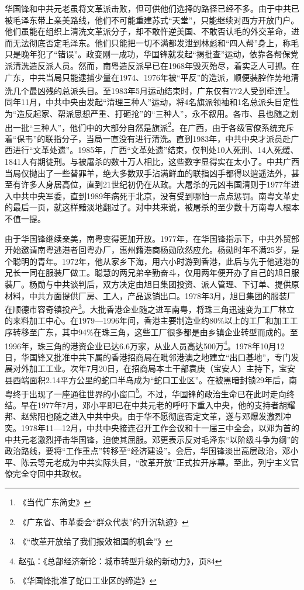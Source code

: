 华国锋和中共元老虽将文革派击败，但可供他们选择的路径已经不多。由于中共已被毛泽东带上亲美路线，他们不可能重建苏式“天堂”，只能继续对西方开放门户。他们虽能在组织上清洗文革派分子，却不敢忤逆美国、不敢否认毛的外交革命，进而无法彻底否定毛泽东。他们只能把一切不满都发泄到林彪和“四人帮”身上，称毛只是晚年犯了“错误”。政变刚一成功，华国锋就发起“揭批查”运动，依靠各帮保党派清洗造反派人员。然而，南粤造反派早已在1968年毁灭殆尽，着实乏人可抓。在广东，中共当局只能逮捕少量在1974、1976年被“平反”的造派，顺便装腔作势地清洗几个最凶残的总派头目。至1983年5月运动结束时，广东仅有772人受到牵连\footnote{《当代广东简史》}。同年11月，中共中央由发起“清理三种人”运动，将4名旗派领袖和1名总派头目定性为“造反起家、帮派思想严重、打砸抢”的“三种人”，永不叙用。各市、县也随之划出一批“三种人”，他们中的大部分自然是旗派\footnote{《广东省、市革委会“群众代表”的升沉轨迹》}。在广西，由于各级官僚系统充斥着“保韦”的联指分子，当局一直没有进行清洗。直到1983年，中共中央才派员赴广西进行“文革处遗”。1985年，广西“文革处遗”结束，仅判处10人死刑、14人死缓、1841人有期徒刑。与被屠杀的数十万人相比，这些数字显得实在太小了。中共广西当局仅抛出了一些替罪羊，绝大多数双手沾满鲜血的联指凶手都得以逍遥法外，甚至有许多人身居高位，直到21世纪初仍在从政。大屠杀的元凶韦国清则于1977年进入中共中央军委，直到1989年病死于北京，没有受到哪怕一点点惩罚。南粤文革史的最后一页，就这样黯淡地翻过了。对中共来说，被屠杀的至少数十万南粤人根本不值一提。

由于华国锋继续亲美，南粤变得更加开放。1977年，在华国锋指示下，中共外贸部开始邀请南粤逃港者回粤办厂，惠州籍港商杨勋欣然应允。杨勋时年不满25岁，是个聪明的青年。1972年，他从家乡下海，用六小时游到香港，此后与先于他逃港的兄长一同在服装厂做工。聪慧的两兄弟辛勤奋斗，仅用两年便开办了自己的旭日服装厂。杨勋与中共谈判后，双方决定由旭日集团投资、派人管理、下订单、提供原材料，中共方面提供厂房、工人，产品返销出口。1978年3月，旭日集团的服装厂在顺德市容奇镇投产\footnote{《“改革开放给了我们报效祖国的机会”》}。大批香港企业随之进军南粤，将珠三角迅速变为工厂林立的来料加工中心。在1979—1996年间，香港主要制造业约80\%以上的工厂和加工工序转移至广东，其中94\%在珠三角，这些工厂很多都是由乡镇企业转型而成的。至1996年，珠三角的港资企业已达6.6万家，从业人员高达500万\footnote{赵弘：《总部经济新论：城市转型升级的新动力》，页84}。1978年10月12日，华国锋又批准中共下属的香港招商局在毗邻港澳之地建立“出口基地”，专门发展对外加工工业。次年7月20日，在招商局本土干部袁庚（宝安人）主持下，宝安县西端面积2.14平方公里的蛇口半岛成为“蛇口工业区”。在被黑暗封锁29年后，南粤终于出现了一座通往世界的小窗口\footnote{《华国锋批准了蛇口工业区的缔造》}。不过，华国锋的政治生命已在此时走向终结。早在1977年7月，邓小平即已在中共元老的呼吁下重入中央，他的支持者胡耀邦、赵紫阳也随之进入中共中央。由于华不愿彻底否定文革，遂与邓爆发激烈冲突。1978年11—12月，中共中央接连召开工作会议和十一届三中全会，以邓为首的中共元老激烈抨击华国锋，迫使其屈服。邓更表示反对毛泽东“以阶级斗争为纲”的政治路线，要将“工作重点”转移至“经济建设”。会后，华国锋淡出高层政治，邓小平、陈云等元老成为中共实际头目，“改革开放”正式拉开序幕。至此，列宁主义官僚完全夺回中共政权。

